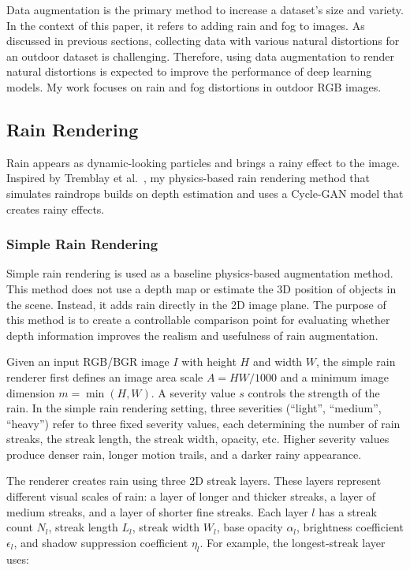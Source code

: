 \documentclass[10pt,letterpaper]{article}
\begin{document}
Data augmentation is the primary method to increase a dataset's size and variety. 
In the context of this paper, it refers to adding rain and fog to images. As discussed 
in previous sections, collecting data with various natural distortions for an outdoor 
dataset is challenging. Therefore, using data augmentation to render natural distortions 
is expected to improve the performance of deep learning models. My work focuses on rain and fog 
distortions in outdoor RGB images.

\subsection{Rain Rendering}

Rain appears as dynamic-looking particles and brings a rainy effect to the image. Inspired by 
Tremblay et al.~\cite{tremblayRainRenderingEvaluating2021}, my physics-based rain rendering method that simulates raindrops builds on depth estimation and uses a Cycle-GAN model that creates rainy effects. 

\subsubsection{Simple Rain Rendering}

Simple rain rendering is used as a baseline physics-based augmentation method. This method does not use a depth map or estimate the 3D position of objects in the scene. 
Instead, it adds rain directly in the 2D image plane. The purpose of this method is to create a controllable comparison point for evaluating whether depth information improves the realism and usefulness of rain augmentation.

Given an input RGB/BGR image $I$ with height $H$ and width $W$, the simple rain renderer first defines an image area scale $A=HW/1000$ and a minimum image dimension $m=\min(H,W)$. A severity value $s$ controls the strength of the rain. 
In the simple rain rendering setting, three severities (``light'', ``medium'', ``heavy'') refer to three fixed severity values, each determining the number of rain streaks, the streak length, the streak width, opacity, etc.
Higher severity values produce denser rain, longer motion trails, and a darker rainy appearance.

The renderer creates rain using three 2D streak layers. These layers represent different visual scales of rain: 
a layer of longer and thicker streaks, a layer of medium streaks, and a layer of shorter fine streaks. 
Each layer $l$ has a streak count $N_l$, streak length $L_l$, streak width $W_l$, base opacity $\alpha_l$, brightness coefficient $\epsilon_l$, and shadow suppression coefficient $\eta_l$. 
For example, the longest-streak layer uses:
\end{document}
